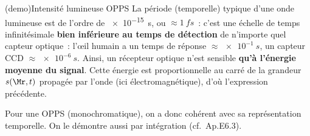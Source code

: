 \documentclass[../../main/main.tex]{subfiles}
\begin{document}
\begin{tcb*}(demo){Intensité lumineuse OPPS}
	La période (temporelle) typique d'une onde lumineuse est de l'ordre de
	\SI{e-15}{s}, ou $\approx \SI{1}{fs}$~: c'est une échelle de temps
	infinitésimale \textbf{bien inférieure au temps de détection} de n'importe
	quel capteur optique~: l'œil humain a un temps de réponse $\approx
		\SI{e-1}{s}$, un capteur CCD $\approx \SI{e-6}{s}$.
	\smallbreak
	Ainsi, un récepteur optique n'est sensible \textbf{qu'à l'énergie moyenne du
		signal}. Cette énergie est proportionnelle au carré de la grandeur $s(\Mr,t)$
	propagée par l'onde (ici électromagnétique), d'où l'expression précédente.
	\tcblower
	\begin{isd}[sidebyside, righthand ratio=.35]
		Pour une OPPS (monochromatique), on a donc
		\psw{%
			\[
				I(\Mr) =
				KA(\Mr)^2
				\underbracket[1pt]{\moy{\cos^2(\wt+\f(\Mr))}}_{= \frac{1}{2}} =
				\frac{1}{2}K A(\Mr)^2
			\]
		}%
		cohérent avec sa représentation temporelle. On le démontre aussi par
		intégration (cf.\ Ap.E6.3).
		\tcblower
		\begin{center}
			\vspace{-15pt}
			\captionsetup{justification=centering}
		\end{center}
	\end{isd}
\end{tcb*}
\end{document}
